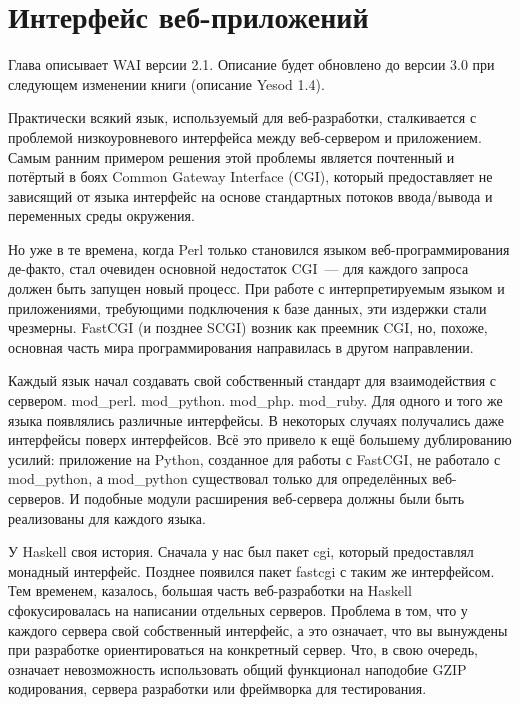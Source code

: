 \chapter{Интерфейс веб-приложений}\label{chap:web_application_interface}

\begin{remark}
    Глава описывает WAI версии 2.1. Описание будет обновлено до версии 3.0 при
    следующем изменении книги (описание Yesod 1.4).
\end{remark}

Практически всякий язык, используемый для веб-разработки, сталкивается с
проблемой низкоуровневого интерфейса между веб-сервером и приложением. Самым
ранним примером решения этой проблемы является почтенный и потёртый в боях
Common Gateway Interface (CGI), который предоставляет не зависящий от языка
интерфейс на основе стандартных потоков ввода/вывода и переменных среды
окружения.

Но уже в те времена, когда Perl только становился языком веб-программирования
де-факто, стал очевиден основной недостаток CGI~--- для каждого запроса должен
быть запущен новый процесс. При работе с интерпретируемым языком и
приложениями, требующими подключения к базе данных, эти издержки стали
чрезмерны. FastCGI (и позднее SCGI) возник как преемник CGI, но, похоже,
основная часть мира программирования направилась в другом направлении.

Каждый язык начал создавать свой собственный стандарт для взаимодействия с
сервером.  mod\_perl. mod\_python. mod\_php. mod\_ruby. Для одного и того же
языка появлялись различные интерфейсы. В некоторых случаях получались даже
интерфейсы поверх интерфейсов.  Всё это привело к ещё большему дублированию
усилий: приложение на Python, созданное для работы с FastCGI, не работало с
mod\_python, а mod\_python существовал только для определённых веб-серверов. И
подобные модули расширения веб-сервера должны были быть реализованы для каждого
языка.

У Haskell своя история. Сначала у нас был пакет cgi, который предоставлял
монадный интерфейс. Позднее появился пакет fastcgi с таким же интерфейсом.  Тем
временем, казалось, большая часть веб-разработки на Haskell сфокусировалась на
написании отдельных серверов.  Проблема в том, что у каждого сервера свой
собственный интерфейс, а это означает, что вы вынуждены при разработке
ориентироваться на конкретный сервер. Что, в свою очередь, означает
невозможность использовать общий функционал наподобие GZIP кодирования, сервера
разработки или фреймворка для тестирования.

